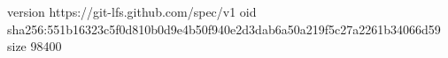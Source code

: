 version https://git-lfs.github.com/spec/v1
oid sha256:551b16323c5f0d810b0d9e4b50f940e2d3dab6a50a219f5c27a2261b34066d59
size 98400
